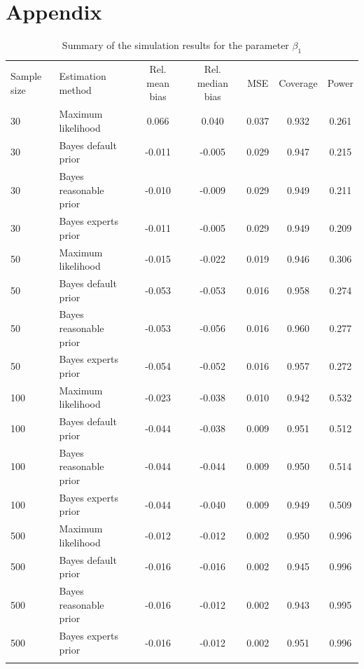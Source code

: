 \documentclass[graybox]{svmult}
\begin{document}
\clearpage

\section*{Appendix}
\label{sec: apendix}


\begin{table}
\caption{Summary of the simulation results for the parameter $\beta_1$}
\label{tab:}
\begin{tabular}[t]{llccccc}
\hline\noalign{\smallskip}
Sample size & Estimation method & Rel. mean bias & Rel. median bias & MSE & Coverage & Power\\
\noalign{\smallskip}\svhline\noalign{\smallskip}
30 & Maximum likelihood & 0.066 & 0.040 & 0.037 & 0.932 & 0.261\\
30 & Bayes default prior & -0.011 & -0.005 & 0.029 & 0.947 & 0.215\\
30 & Bayes reasonable prior & -0.010 & -0.009 & 0.029 & 0.949 & 0.211\\
30 & Bayes experts prior & -0.011 & -0.005 & 0.029 & 0.949 & 0.209\\
\noalign{\smallskip}
50 & Maximum likelihood & -0.015 & -0.022 & 0.019 & 0.946 & 0.306\\
50 & Bayes default prior & -0.053 & -0.053 & 0.016 & 0.958 & 0.274\\
50 & Bayes reasonable prior & -0.053 & -0.056 & 0.016 & 0.960 & 0.277\\
50 & Bayes experts prior & -0.054 & -0.052 & 0.016 & 0.957 & 0.272\\
\noalign{\smallskip}
100 & Maximum likelihood & -0.023 & -0.038 & 0.010 & 0.942 & 0.532\\
100 & Bayes default prior & -0.044 & -0.038 & 0.009 & 0.951 & 0.512\\
100 & Bayes reasonable prior & -0.044 & -0.044 & 0.009 & 0.950 & 0.514\\
100 & Bayes experts prior & -0.044 & -0.040 & 0.009 & 0.949 & 0.509\\
\noalign{\smallskip}
500 & Maximum likelihood & -0.012 & -0.012 & 0.002 & 0.950 & 0.996\\
500 & Bayes default prior & -0.016 & -0.016 & 0.002 & 0.945 & 0.996\\
500 & Bayes reasonable prior & -0.016 & -0.012 & 0.002 & 0.943 & 0.995\\
500 & Bayes experts prior & -0.016 & -0.012 & 0.002 & 0.951 & 0.996\\
\noalign{\smallskip}\hline\noalign{\smallskip}
\end{tabular}
\end{table}
\end{document}

